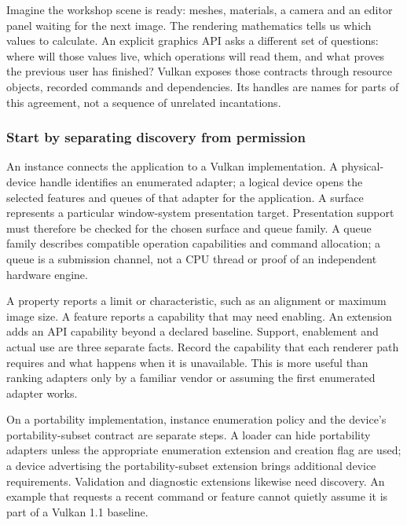 Imagine the workshop scene is ready: meshes, materials, a camera and an editor panel waiting for the next image. The rendering mathematics tells us which values to calculate. An explicit graphics API asks a different set of questions: where will those values live, which operations will read them, and what proves the previous user has finished? Vulkan exposes those contracts through resource objects, recorded commands and dependencies. Its handles are names for parts of this agreement, not a sequence of unrelated incantations.

\subsubsection{Start by separating discovery from permission}\label{05-engine-i-ch019-start-by-separating-discovery-from-permission}

\hypertarget{05-engine-i-ch019-start-by-separating-discovery-from-permission}{}

An instance connects the application to a Vulkan implementation. A physical-device handle identifies an enumerated adapter; a logical device opens the selected features and queues of that adapter for the application. A surface represents a particular window-system presentation target. Presentation support must therefore be checked for the chosen surface and queue family. A queue family describes compatible operation capabilities and command allocation; a queue is a submission channel, not a CPU thread or proof of an independent hardware engine.

A property reports a limit or characteristic, such as an alignment or maximum image size. A feature reports a capability that may need enabling. An extension adds an API capability beyond a declared baseline. Support, enablement and actual use are three separate facts. Record the capability that each renderer path requires and what happens when it is unavailable. This is more useful than ranking adapters only by a familiar vendor or assuming the first enumerated adapter works.

On a portability implementation, instance enumeration policy and the device's portability-subset contract are separate steps. A loader can hide portability adapters unless the appropriate enumeration extension and creation flag are used; a device advertising the portability-subset extension brings additional device requirements. Validation and diagnostic extensions likewise need discovery. An example that requests a recent command or feature cannot quietly assume it is part of a Vulkan 1.1 baseline.

